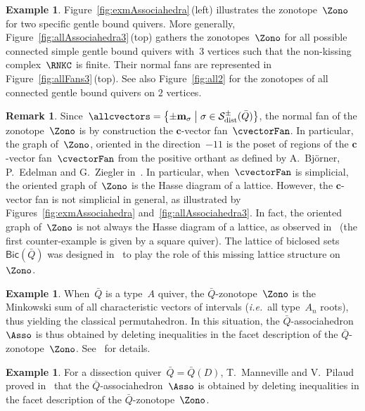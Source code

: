 \documentclass{amsart}
\theoremstyle{definition}
\newtheorem{example}[theorem]{Example}
\newtheorem{remark}[theorem]{Remark}
\renewcommand{\b}[1]{\mathbf{#1}} %
\newcommand{\set}[2]{\left\{ #1 \;\middle|\; #2 \right\}} %
\newcommand{\one}{{1\!\!1}} %
\newcommand{\fref}[1]{Figure~\ref{#1}} %
\newcommand{\ie}{\textit{i.e.}~} %
\newcommand{\distinguishableStrings}{\mathcal{S}_\mathrm{dist}} %
\newcommand{\Bicl}[1]{\mathsf{Bic}(#1)} %
\newcommand{\multiplicityVector}{\b{m}} %
\begin{document}
\begin{example}
\fref{fig:exmAssociahedra}\,(left) illustrates the zonotope~$\Zono$ for two specific gentle bound quivers.
More generally, \fref{fig:allAssociahedra3}\,(top) gathers the zonotopes~$\Zono$ for all possible connected simple gentle bound quivers with~$3$ vertices such that the non-kissing complex~$\RNKC$ is finite.
Their normal fans are represented in \fref{fig:allFans3}\,(top).
See also \fref{fig:all2} for the zonotopes of all connected gentle bound quivers on $2$ vertices.
\end{example}

\begin{remark}
Since~$\allcvectors = \set{\pm \multiplicityVector_\sigma}{\sigma \in \distinguishableStrings^\pm(\bar Q)}$, the normal fan of the zonotope~$\Zono$ is by construction the $\b{c}$-vector fan~$\cvectorFan$.
In particular, the graph of~$\Zono$, oriented in the direction~$-\one$ is the poset of regions of the $\b{c}$-vector fan~$\cvectorFan$ from the positive orthant as defined by A.~Bj\"orner, P.~Edelman and G.~Ziegler in~\cite{BjornerEdelmanZiegler}.
In particular, when~$\cvectorFan$ is simplicial, the oriented graph of~$\Zono$ is the Hasse diagram of a lattice.
However, the $\b{c}$-vector fan is not simplicial in general, as illustrated by Figures~\ref{fig:exmAssociahedra} and~\ref{fig:allAssociahedra3}.
In fact, the oriented graph of~$\Zono$ is not always the Hasse diagram of a lattice, as observed in~\cite[Rem.~6.2]{McConville} (the first counter-example is given by a square quiver).
The lattice of biclosed sets~$\Bicl{\bar Q}$ was designed in~\cite{McConville} to play the role of this missing lattice structure on~$\Zono$.
\end{remark}

\begin{example}
\label{exm:permutahedron}
When~$\bar Q$ is a type~$A$ quiver, the $\bar Q$-zonotope~$\Zono$ is the Minkowski sum of all characteristic vectors of intervals (\ie all type~$A_n$ roots), thus yielding the classical permutahedron.
In this situation, the $\bar Q$-associahedron~$\Asso$ is thus obtained by deleting inequalities in the facet description of the $\bar Q$-zonotope~$\Zono$.
See~\cite{Loday, HohlwegLange, LangePilaud} for details.
\end{example}

\begin{example}
For a dissection quiver~$\bar Q = \bar Q(D)$, T.~Manneville and V.~Pilaud proved in~\cite{MannevillePilaud-accordion} that the $\bar Q$-associahedron~$\Asso$ is obtained by deleting inequalities in the facet description of the $\bar Q$-zonotope~$\Zono$.
\end{example}
\end{document}
